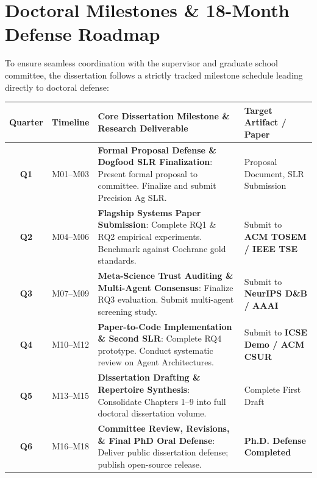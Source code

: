 \documentclass[10pt,a4paper]{article}
\begin{document}
\newpage

\section{Doctoral Milestones \& 18-Month Defense Roadmap}

To ensure seamless coordination with the supervisor and graduate school committee, the dissertation follows a strictly tracked milestone schedule leading directly to doctoral defense:

\vspace{-2pt}

\begin{table}[htbp]
\centering\footnotesize
\begin{tabularx}{\linewidth}{cc>{\raggedright\arraybackslash}p{6.8cm}>{\raggedright\arraybackslash}X}
\toprule
\textbf{Quarter} & \textbf{Timeline} & \textbf{Core Dissertation Milestone \& Research Deliverable} & \textbf{Target Artifact / Paper} \\
\midrule
\textbf{Q1} & M01--M03 & \textbf{Formal Proposal Defense \& Dogfood SLR Finalization}: Present formal proposal to committee. Finalize and submit Precision Ag SLR. & Proposal Document, SLR Submission \\
\textbf{Q2} & M04--M06 & \textbf{Flagship Systems Paper Submission}: Complete RQ1 \& RQ2 empirical experiments. Benchmark against Cochrane gold standards. & Submit to \textbf{ACM TOSEM / IEEE TSE} \\
\textbf{Q3} & M07--M09 & \textbf{Meta-Science Trust Auditing \& Multi-Agent Consensus}: Finalize RQ3 evaluation. Submit multi-agent screening study. & Submit to \textbf{NeurIPS D\&B / AAAI} \\
\textbf{Q4} & M10--M12 & \textbf{Paper-to-Code Implementation \& Second SLR}: Complete RQ4 prototype. Conduct systematic review on Agent Architectures. & Submit to \textbf{ICSE Demo / ACM CSUR} \\
\textbf{Q5} & M13--M15 & \textbf{Dissertation Drafting \& Repertoire Synthesis}: Consolidate Chapters 1--9 into full doctoral dissertation volume. & Complete First Draft \\
\textbf{Q6} & M16--M18 & \textbf{Committee Review, Revisions, \& Final PhD Oral Defense}: Deliver public dissertation defense; publish open-source release. & \textbf{Ph.D. Defense Completed} \\
\bottomrule
\end{tabularx}
\end{table}
\end{document}
